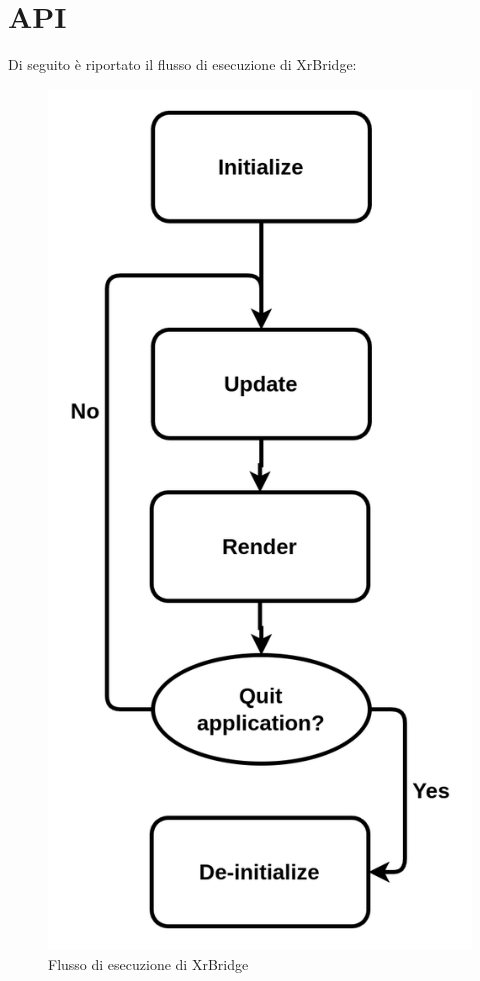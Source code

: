 \documentclass[twoside]{supsistudent}
\begin{document}
\section{API}

Di seguito è riportato il flusso di esecuzione di XrBridge:

\begin{figure}[h]
  \caption{Flusso di esecuzione di XrBridge}
  \centering
  \includegraphics[scale=0.2]{resources/flow.png}
\end{figure}
\end{document}
